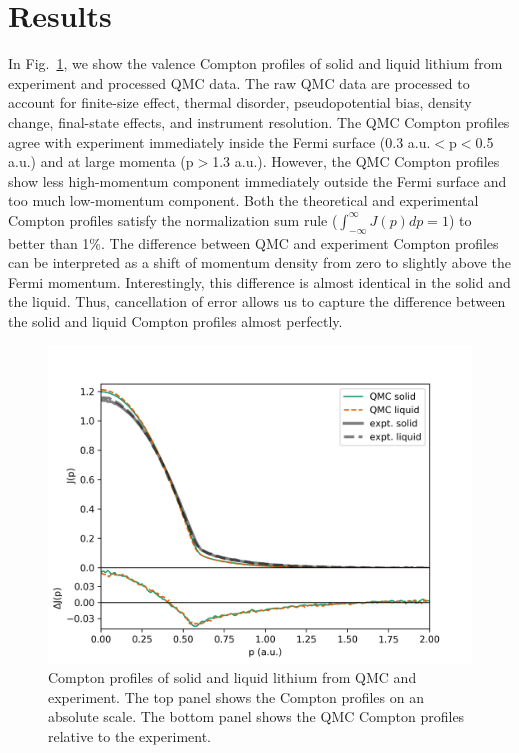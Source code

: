 \documentclass[aps,prb,showpacs,preprintnumbers,amsmath,amssymb,superscriptaddress,twocolumn]{revtex4}
\begin{document}
\section{Results} \label{sec:results}

In Fig.~\ref{fig:sl-jp-djp}, we show the valence Compton profiles of solid and liquid lithium from experiment and processed QMC data. The raw QMC data are processed to account for finite-size effect, thermal disorder, pseudopotential bias, density change, final-state effects, and instrument resolution. The QMC Compton profiles agree with experiment immediately inside the Fermi surface (0.3 a.u.$<$p$<$0.5 a.u.) and at large momenta (p$>$1.3  a.u.). However, the QMC Compton profiles show less high-momentum component immediately outside the Fermi surface and too much low-momentum component. Both the theoretical and experimental Compton profiles satisfy the normalization sum rule ($\int_{-\infty}^{\infty} J(p)dp=1$) to better than 1\%. The difference between QMC and experiment Compton profiles can be interpreted as a shift of momentum density from zero to slightly above the Fermi momentum. Interestingly, this difference is almost identical in the solid and the liquid. Thus, cancellation of error allows us to capture the difference between the solid and liquid Compton profiles almost perfectly.

\begin{figure}[h]
\includegraphics[width=\linewidth]{figures/li52e_sl-jp}
\caption{Compton profiles of solid and liquid lithium from QMC and experiment. The top panel shows the Compton profiles on an absolute scale. The bottom panel shows the QMC Compton profiles relative to the experiment.\label{fig:sl-jp-djp}}
\end{figure}
\end{document}
